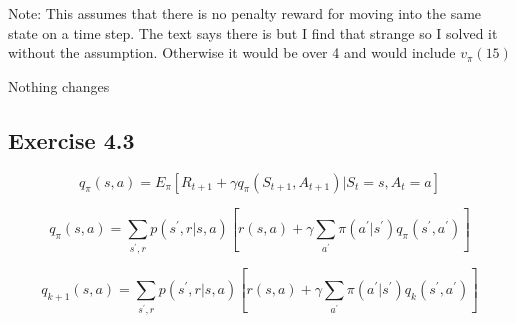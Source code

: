 Note: This assumes that there is no penalty reward for moving into the same state on a time step. The text says there is but I find that strange so I solved it without the assumption. Otherwise it would be over 4 and would include $v_\pi(15)$

Nothing changes

\subsection{Exercise 4.3}
\begin{equation}
  q_\pi(s,a) = E_\pi[R_{t+1} + \gamma q_\pi(S_{t+1},A_{t+1}) | S_t = s, A_t = a]
\end{equation}

\begin{equation}
  q_\pi(s,a) = \sum_{s^\prime, r} p(s^\prime, r| s,a)[r(s,a) + \gamma \sum_{a^\prime} \pi(a^\prime|s^\prime) q_\pi(s^\prime, a^\prime)]
\end{equation}

\begin{equation}
  q_{k+1}(s,a) = \sum_{s^\prime, r} p(s^\prime, r| s,a)[r(s,a) + \gamma \sum_{a^\prime} \pi(a^\prime|s^\prime) q_k(s^\prime, a^\prime)]
\end{equation}


